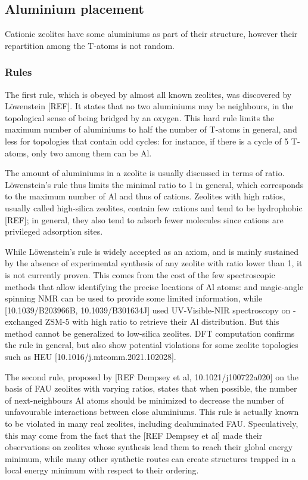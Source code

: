 \documentclass[main.tex]{subfiles}
\begin{document}
\subsection{Aluminium placement}

Cationic zeolites have some aluminiums as part of their structure, however their repartition among the T-atoms is not random.

\subsubsection{Rules}

The first rule, which is obeyed by almost all known zeolites, was discovered by L\"owenstein [REF]. It states that no two aluminiums may be neighbours, in the topological sense of being bridged by an oxygen. This hard rule limits the maximum number of aluminiums to half the number of T-atoms in general, and less for topologies that contain odd cycles: for instance, if there is a cycle of 5 T-atoms, only two among them can be Al.

The amount of aluminiums in a zeolite is usually discussed in terms of \SiAl ratio. L\"owenstein's rule thus limits the minimal \SiAl ratio to 1 in general, which corresponds to the maximum number of Al and thus of cations. Zeolites with high \SiAl ratios, usually called high-silica zeolites, contain few cations and tend to be hydrophobic [REF]; in general, they also tend to adsorb fewer molecules since cations are privileged adsorption sites.

While L\"owenstein's rule is widely accepted as an axiom, and is mainly sustained by the absence of experimental synthesis of any zeolite with \SiAl ratio lower than 1, it is not currently proven. This comes from the cost of the few spectroscopic methods that allow identifying the precise locations of Al atoms:  and  magic-angle spinning NMR can be used to provide some limited information, while [10.1039/B203966B, 10.1039/B301634J] used UV-Visible-NIR spectroscopy on -exchanged ZSM-5 with high \SiAl ratio to retrieve their Al distribution. But this method cannot be generalized to low-silica zeolites. DFT computation confirms the rule in general, but also show potential violations for some zeolite topologies such as HEU [10.1016/j.mtcomm.2021.102028].

The second rule, proposed by [REF Dempsey et al, 10.1021/j100722a020] on the basis of FAU zeolites with varying \SiAl ratios, states that when possible, the number of next-neighbours Al atoms should be minimized to decrease the number of unfavourable interactions between close aluminiums. This rule is actually known to be violated in many real zeolites, including dealuminated FAU. Speculatively, this may come from the fact that the [REF Dempsey et al] made their observations on zeolites whose synthesis lead them to reach their global energy minimum, while many other synthetic routes can create structures trapped in a local energy minimum with respect to their \SiAl ordering.
\end{document}
